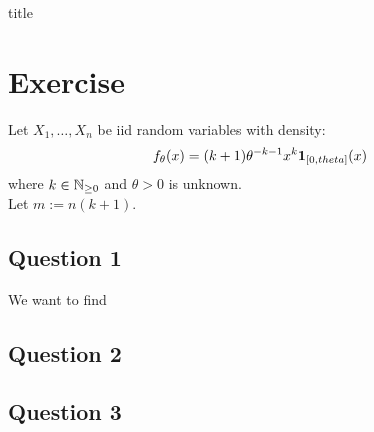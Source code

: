 \documentclass[12pt]{article}
\begin{document}
{title}

\tableofcontents


\section{Exercise}
Let \(X_1, \ldots, X_n\) be \gls{iid} random variables with density:
\begin{equation}
    \label{eqn: ex1 pdf}
    f_{\theta}(x) = (k+1) \theta^{-k-1} x^k \mathbf{1}_{[0, theta]} (x)
\end{equation}
where \(k \in \mathbb{N}_{\geq 0}\) and \(\theta > 0\) is unknown. \\
Let \(m := n(k+1)\).

\subsection{Question 1}
We want to find 
\subsection{Question 2}
\subsection{Question 3}



\end{document}

